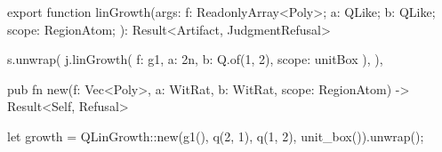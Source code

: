 \begin{tssrc}
export function linGrowth(args: {
  f: ReadonlyArray<Poly>;
  a: QLike;
  b: QLike;
  scope: RegionAtom;
}): Result<Artifact, JudgmentRefusal>
\end{tssrc}
\begin{tssrc}
s.unwrap(
  j.linGrowth({ f: g1, a: 2n, b: Q.of(1, 2), scope: unitBox }),
),
\end{tssrc}
\begin{rustsrc}
pub fn new(f: Vec<Poly>, a: WitRat, b: WitRat, scope: RegionAtom) -> Result<Self, Refusal>
\end{rustsrc}
\begin{rustsrc}
let growth = QLinGrowth::new(g1(), q(2, 1), q(1, 2), unit_box()).unwrap();
\end{rustsrc}
